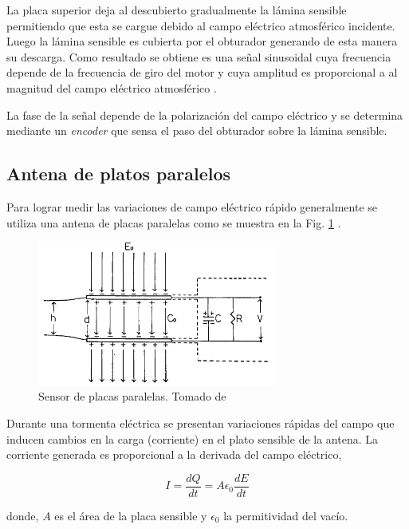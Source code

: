 \documentclass[12pt,a4paper,oneside]{book}
\begin{document}
La placa superior deja al descubierto gradualmente la lámina sensible permitiendo que esta se cargue debido al campo eléctrico atmosférico incidente. Luego la lámina sensible es cubierta por el obturador generando de esta manera su descarga. Como resultado se obtiene es una señal sinusoidal cuya frecuencia depende de la frecuencia de giro del motor y cuya amplitud es proporcional a al magnitud del campo eléctrico atmosférico \cite{mosquera2015}. 

La fase de la señal depende de la polarización del campo eléctrico y se determina mediante un \textit{encoder} que sensa el paso del obturador sobre la lámina sensible.

\subsection{Antena de platos paralelos}

Para lograr medir las variaciones de campo eléctrico rápido generalmente se utiliza una antena de placas paralelas como se muestra en la Fig. \ref{figc} \cite{ogawa1973analyses}. 

\begin{figure}[h!]
  \centering
  \includegraphics[width=0.7\textwidth]{Cap.png}
  \caption{ Sensor de placas paralelas. Tomado de  \cite{ogawa1973analyses} }
  \label{figc}
\end{figure}

Durante una tormenta eléctrica se presentan variaciones rápidas del campo que inducen cambios en la carga (corriente) en el plato sensible de la antena. La corriente generada es proporcional a la derivada del campo eléctrico,

\begin{equation}
    I = \frac{dQ}{dt} = A\epsilon_0 \frac{dE}{dt} 
\end{equation}

donde, $A$ es el área de la placa sensible y $\epsilon_0$ la permitividad del vacío.
\end{document}
